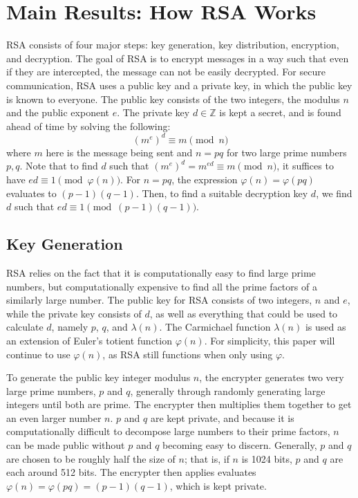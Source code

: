 \documentclass{article}
\newcommand{\Z}{\mathbb{Z}}
\begin{document}
\section{Main Results: How RSA Works}
RSA consists of four major steps: key generation, key distribution, encryption, and decryption. The goal of RSA is to encrypt messages in a way such that even if they are intercepted, the message can not be easily decrypted. For secure communication, RSA uses a public key and a private key, in which the public key is known to everyone. The public key consists of the two integers, the modulus $n$ and the public exponent $e$. The private key $d \in \Z$ is kept a secret, and is found ahead of time by solving the following:
$$(m^e)^d \equiv m \pmod n$$
where $m$ here is the message being sent and $n = pq$ for two large prime numbers $p, q$. Note that to find $d$ such that $(m^e)^d = m^{ed} \equiv m \pmod n$, it suffices to have $ed \equiv 1 \pmod{\varphi(n)}$. For $n=pq$, the expression $\varphi(n)=\varphi(pq)$ evaluates to $(p-1)(q-1)$. Then, to find a suitable decryption key $d$, we find $d$ such that $ed \equiv 1 \pmod{(p-1)(q-1)}$.

\subsection{Key Generation}
RSA relies on the fact that it is computationally easy to find large prime numbers, but computationally expensive to find all the prime factors of a similarly large number. The public key for RSA consists of two integers, $n$ and $e$, while the private key consists of $d$, as well as everything that could be used to calculate $d$, namely $p$, $q$, and $\lambda(n)$. The Carmichael function $\lambda(n)$ is used as an extension of Euler's totient function $\varphi(n)$. For simplicity, this paper will continue to use $\varphi(n)$, as RSA still functions when only using $\varphi$.

To generate the public key integer modulus $n$, the encrypter generates two very large prime numbers, $p$ and $q$, generally through randomly generating large integers until both are prime. The encrypter then multiplies them together to get an even larger number $n$. $p$ and $q$ are kept private, and because it is computationally difficult to decompose large numbers to their prime factors, $n$ can be made public without $p$ and $q$ becoming easy to discern. Generally, $p$ and $q$ are chosen to be roughly half the size of $n$; that is, if $n$ is 1024 bits, $p$ and $q$ are each around 512 bits. The encrypter then applies evaluates $\varphi(n)=\varphi(pq) = (p-1)(q-1)$, which is kept private. 
\end{document}
